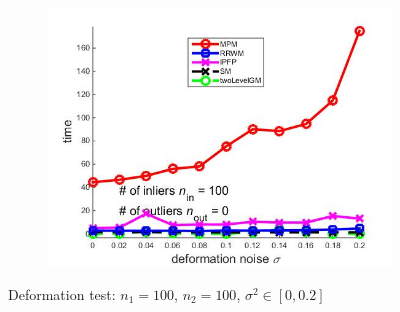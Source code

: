 \documentclass[
	fontsize=12pt,
	paper=a4,
	twoside=false,
	numbers=noenddot,
	plainheadsepline,
	toc=listof,
	toc=bibliography
]{scrartcl}
\begin{document}
\begin{figure}[h]
\begin{subfigure}[b]{0.3\textwidth}
	\end{subfigure} 
	\begin{subfigure}[b]{0.3\textwidth}
		\centering
		\includegraphics[scale=0.25]{"fig_ver2108/syntheticPointSets/deformation_test/time_greedy"} 
	\end{subfigure} 	
	\caption{ Deformation test: $n_1=100$, $n_2=100$, $\sigma^2\in[0, 0.2]$}
	\label{fig:def_test1}
\end{figure}

\FloatBarrier	
\end{document}
